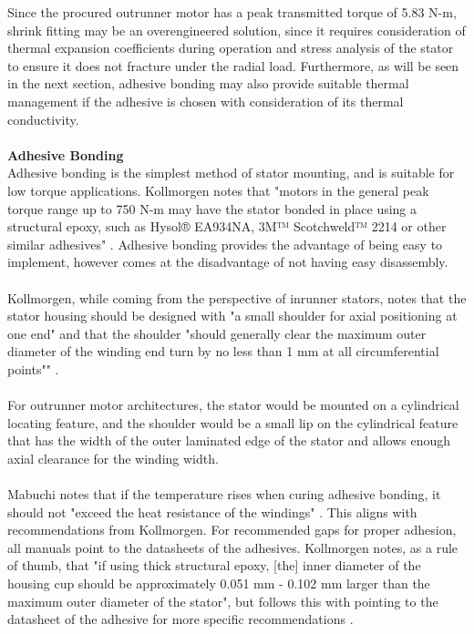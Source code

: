 \documentclass[internal]{../../classes/nervtech-research}
\begin{document}
Since the procured outrunner motor has a peak transmitted torque of 5.83 N-m, shrink fitting may be an overengineered solution, since it requires consideration of thermal expansion coefficients during operation and stress analysis of the stator to ensure it does not fracture under the radial load.
Furthermore, as will be seen in the next section, adhesive bonding may also provide suitable thermal management if the adhesive is chosen with consideration of its thermal conductivity.
\\\\
\textbf{Adhesive Bonding}
\\
Adhesive bonding is the simplest method of stator mounting, and is suitable for low torque applications.
Kollmorgen notes that "motors in the general peak torque range up to 750 N-m may have the stator bonded in place using a structural epoxy, such as Hysol® EA934NA, 3M™ Scotchweld™ 2214 or other similar adhesives" \cite{KollmorgenManual}.
Adhesive bonding provides the advantage of being easy to implement, however comes at the disadvantage of not having easy disassembly.
\\\\
Kollmorgen, while coming from the perspective of inrunner stators, notes that the stator housing should be designed with "a small shoulder for axial positioning at one end" and that the shoulder "should generally clear the maximum outer diameter of the winding end turn by no less than 1 mm at all circumferential points"" \cite{KollmorgenManual}.
\\\\
For outrunner motor architectures, the stator would be mounted on a cylindrical locating feature, and the shoulder would be a small lip on the cylindrical feature that has the width of the outer laminated edge of the stator and allows enough axial clearance for the winding width.
\\\\
Mabuchi notes that if the temperature rises when curing adhesive bonding, it should not "exceed the heat resistance of the windings" \cite{MabuchiManual}.
This aligns with recommendations from Kollmorgen.
For recommended gaps for proper adhesion, all manuals point to the datasheets of the adhesives.
Kollmorgen notes, as a rule of thumb, that "if using thick structural epoxy, [the] inner diameter of the housing cup should be approximately 0.051 mm - 0.102 mm larger than the maximum outer diameter of the stator", but follows this with pointing to the datasheet of the adhesive for more specific recommendations \cite{KollmorgenManual}.
\end{document}
